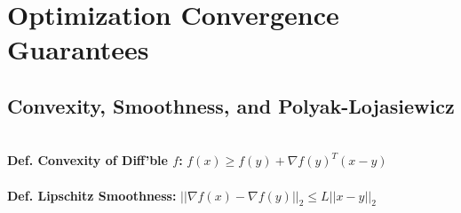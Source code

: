 \color{black}
\section*{Optimization Convergence Guarantees}

\subsection*{Convexity, Smoothness, and Polyak-Lojasiewicz}
\\
\textbf{Def. Convexity of Diff'ble $f$:} $f(x)\geq f(y)+\nabla f(y)^T(x-y)$\\
\\
\textbf{Def. Lipschitz Smoothness:} $||\nabla f(x)-\nabla f(y)||_2\leq L||x-y||_2$\\

